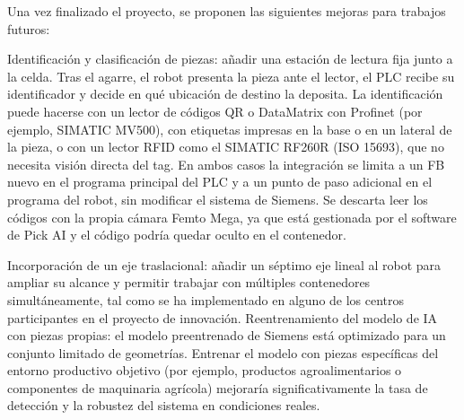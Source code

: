 Una vez finalizado el proyecto, se proponen las siguientes mejoras para trabajos futuros:

Identificación y clasificación de piezas: añadir una estación de lectura fija junto a la celda. Tras el agarre, el robot presenta la pieza ante el lector, el PLC recibe su identificador y decide en qué ubicación de destino la deposita. La identificación puede hacerse con un lector de códigos QR o DataMatrix con Profinet (por ejemplo, SIMATIC MV500), con etiquetas impresas en la base o en un lateral de la pieza, o con un lector RFID como el SIMATIC RF260R (ISO 15693), que no necesita visión directa del tag. En ambos casos la integración se limita a un FB nuevo en el programa principal del PLC y a un punto de paso adicional en el programa del robot, sin modificar el sistema de Siemens. Se descarta leer los códigos con la propia cámara Femto Mega, ya que está gestionada por el software de Pick AI y el código podría quedar oculto en el contenedor.


Incorporación de un eje traslacional: añadir un séptimo eje lineal al robot para ampliar su alcance y permitir trabajar con múltiples contenedores simultáneamente, tal como se ha implementado en alguno de los centros participantes en el proyecto de innovación.
Reentrenamiento del modelo de IA con piezas propias: el modelo preentrenado de Siemens está optimizado para un conjunto limitado de geometrías. Entrenar el modelo con piezas específicas del entorno productivo objetivo (por ejemplo, productos agroalimentarios o componentes de maquinaria agrícola) mejoraría significativamente la tasa de detección y la robustez del sistema en condiciones reales.
